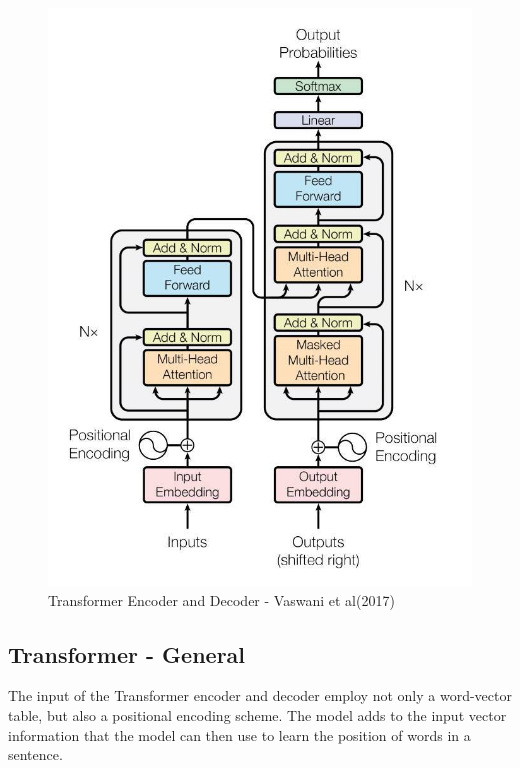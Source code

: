 \begin{figure}[H]
	\begin{center}
		
		
		\includegraphics[scale=2.0]{diagram-mat04}
	\end{center}
	\caption[Transformer Encoder and Decoder]{Transformer Encoder and Decoder - Vaswani et al(2017)\cite{Vaswani2017AttentionIA}}
	
\end{figure}

\subsection*{Transformer - General}

The input of the Transformer encoder and decoder employ not only a word-vector table, but also a positional encoding scheme. The model adds to the input vector information that the model can then use to learn the position of words in a sentence. 

